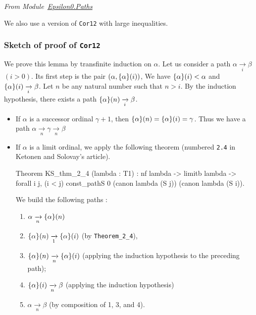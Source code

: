 
\emph{From
  Module~\href{../theories/html/hydras.Epsilon0.Paths.html}{Epsilon0.Paths}}




We  also use a version of \texttt{Cor12} with large inequalities.





\subsubsection{Sketch of proof of \texttt{Cor12}}

We prove this lemma by transfinite induction on $\alpha$.
Let us consider a path $\alpha \xrightarrow [i]{} \beta$ $(i>0)$. Its first step is
the pair $(\alpha,\mbox{$\{\alpha\}(i)$})$, We have $\mbox{$\{\alpha\}(i)$}<\alpha$ and
$\mbox{$\{\alpha\}(i)$} \xrightarrow [i]{} \beta$. 
Let $n$ be any natural number such that $n>i$.
By the induction hypothesis, there exists a path $\mbox{$\{\alpha\}(n)$} \xrightarrow[i]{} \beta$.
\begin{itemize}
\item  If $\alpha$ is a successor ordinal $\gamma+1$, then $\mbox{$\{\alpha\}(n)$} =
\mbox{$\{\alpha\}(i)$}=\gamma$. Thus we have a path 
$\alpha  \xrightarrow [n]{}  \gamma \xrightarrow [n]{} \beta$
\item If $\alpha$ is a limit ordinal, we apply the following theorem (numbered \texttt{2.4} in Ketonen and Solovay's article). 



\begin{Coqsrc}
Theorem KS_thm_2_4 (lambda : T1) :
   nf lambda ->
   limitb lambda  ->
   forall i j, (i < j)%
               const_pathS 0 (canon lambda (S j))
                             (canon lambda (S i)).
\end{Coqsrc}

 We build the following paths :

 \begin{enumerate}
 \item $\alpha \xrightarrow[n]{} \mbox{$\{\alpha\}(n)$}$
 \item $\mbox{$\{\alpha\}(n)$} \xrightarrow[1]{} \mbox{$\{\alpha\}(i)$}$ (by \texttt{Theorem\_2\_4}),
\item $\mbox{$\{\alpha\}(n)$} \xrightarrow[n]{} \mbox{$\{\alpha\}(i)$}$ (applying the induction hypothesis to the preceding path);
\item $\mbox{$\{\alpha\}(i)$} \xrightarrow[n]{} \beta$ (applying the induction hypothesis)\item $\alpha \xrightarrow[n]{} \beta$ (by composition of 1, 3, and 4).


 \end{enumerate}


\end{itemize}
